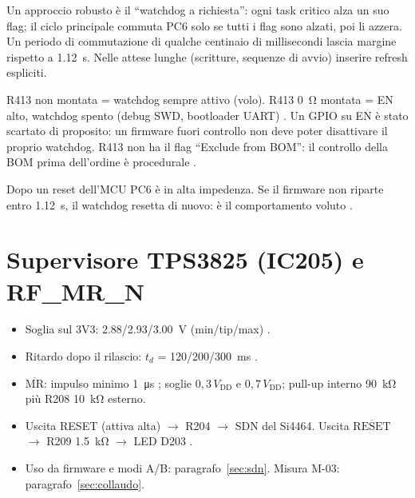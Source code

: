\begin{nota}
Un approccio robusto è il \enquote{watchdog a richiesta}: ogni task critico alza un suo flag; il ciclo principale commuta PC6 solo se tutti i flag sono alzati, poi li azzera. Un periodo di commutazione di qualche centinaio di millisecondi lascia margine rispetto a \SI{1.12}{\second}. Nelle attese lunghe (scritture, sequenze di avvio) inserire refresh espliciti.
\end{nota}

\begin{attenzione}
R413 non montata = watchdog sempre attivo (volo). R413 \SI{0}{\ohm} montata = EN alto, watchdog spento (debug SWD, bootloader UART) . Un GPIO su EN è stato scartato di proposito: un firmware fuori controllo non deve poter disattivare il proprio watchdog. R413 non ha il flag \enquote{Exclude from BOM}: il controllo della BOM prima dell'ordine è procedurale .
\end{attenzione}

Dopo un reset dell'MCU PC6 è in alta impedenza. Se il firmware non riparte entro \SI{1.12}{\second}, il watchdog resetta di nuovo: è il comportamento voluto .

\section{Supervisore TPS3825 (IC205) e RF\_MR\_N}
\begin{itemize}
\item Soglia sul 3V3: \SI{2.88}{}/\SI{2.93}{}/\SI{3.00}{\volt} (min/tip/max) .
\item Ritardo dopo il rilascio: $t_d$ = \SI{120}{}/\SI{200}{}/\SI{300}{\milli\second} .
\item \(\overline{\mathrm{MR}}\): impulso minimo \SI{1}{\micro\second} ; soglie \(0{,}3\,V_\text{DD}\) e \(0{,}7\,V_\text{DD}\); pull-up interno \SI{90}{\kilo\ohm}  più R208 \SI{10}{\kilo\ohm} esterno.
\item Uscita RESET (attiva alta) $\to$ R204 $\to$ SDN del Si4464. Uscita \(\overline{\mathrm{RESET}}\) $\to$ R209 \SI{1.5}{\kilo\ohm} $\to$ LED D203 .
\item Uso da firmware e modi A/B: paragrafo~\ref{sec:sdn}. Misura M-03: paragrafo~\ref{sec:collaudo}.
\end{itemize}

